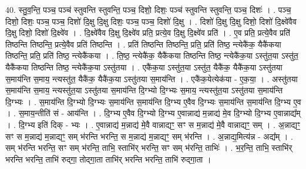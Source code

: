 \documentclass[17pt]{extarticle}
\begin{document}
40. स्तु॒व॒न्ति॒ पञ्च॒ पञ्च॑ स्तुवन्ति स्तुवन्ति॒ पञ्च॒ दिशो॒ दिशः॒ पञ्च॑ स्तुवन्ति स्तुवन्ति॒ पञ्च॒ दिशः॑ । . पञ्च॒ दिशो॒ दिशः॒ पञ्च॒ पञ्च॒ दिशो॑ दि॒क्षु दि॒क्षु दिशः॒ पञ्च॒ पञ्च॒ दिशो॑ दि॒क्षु । . दिशो॑ दि॒क्षु दि॒क्षु दिशो॒ दिशो॑ दि॒क्ष्वे॑वैव दि॒क्षु दिशो॒ दिशो॑ दि॒क्ष्वे॑व । . दि॒क्ष्वे॑वैव दि॒क्षु दि॒क्ष्वे॑व प्रति॒ प्रत्ये॒व दि॒क्षु दि॒क्ष्वे॑व प्रति॑ । . ए॒व प्रति॒ प्रत्ये॒वैव प्रति॑ तिष्ठन्ति तिष्ठन्ति॒ प्रत्ये॒वैव प्रति॑ तिष्ठन्ति । . प्रति॑ तिष्ठन्ति तिष्ठन्ति॒ प्रति॒ प्रति॑ तिष्ठ॒ न्त्येकै॑क॒ यैकै॑कया तिष्ठन्ति॒ प्रति॒ प्रति॑ तिष्ठ॒ न्त्येकै॑कया । . ति॒ष्ठ॒ न्त्येकै॑क॒ यैकै॑कया तिष्ठन्ति तिष्ठ॒ न्त्येकै॑क॒या ऽस्तु॑त॒या ऽस्तु॑त॒ यैकै॑कया तिष्ठन्ति तिष्ठ॒ न्त्येकै॑क॒या ऽस्तु॑तया । . एकै॑क॒या ऽस्तु॑त॒या ऽस्तु॑त॒ यैकै॑क॒ यैकै॑क॒या ऽस्तु॑तया स॒माय॑न्ति स॒माय॒ न्त्यस्तु॑त॒ यैकै॑क॒
यैकै॑क॒या ऽस्तु॑तया स॒माय॑न्ति । . एकै॑क॒येत्येक॑या - ए॒क॒या॒ । . अस्तु॑तया स॒माय॑न्ति स॒माय॒ न्त्यस्तु॑त॒या ऽस्तु॑तया स॒माय॑न्ति दि॒ग्भ्यो दि॒ग्भ्यः स॒माय॒ न्त्यस्तु॑त॒या ऽस्तु॑तया स॒माय॑न्ति दि॒ग्भ्यः । . स॒माय॑न्ति दि॒ग्भ्यो दि॒ग्भ्यः स॒माय॑न्ति स॒माय॑न्ति दि॒ग्भ्य ए॒वैव दि॒ग्भ्यः स॒माय॑न्ति स॒माय॑न्ति दि॒ग्भ्य ए॒व । . स॒माय॒न्तीति॑ सं - आय॑न्ति । . दि॒ग्भ्य ए॒वैव दि॒ग्भ्यो दि॒ग्भ्य ए॒वान्नाद्य॑ म॒न्नाद्य॑ मे॒व दि॒ग्भ्यो दि॒ग्भ्य ए॒वान्नाद्य᳚म् । . दि॒ग्भ्य इति॑ दिक् - भ्यः । . ए॒वान्नाद्य॑ म॒न्नाद्य॑ मे॒वै वान्नाद्यꣳ॒॒ सꣳ स म॒न्नाद्य॑ मे॒वै वान्नाद्यꣳ॒॒ सम् । . अ॒न्नाद्यꣳ॒॒ सꣳ स म॒न्नाद्य॑ म॒न्नाद्यꣳ॒॒ सम् भ॑रन्ति भरन्ति॒ स म॒न्नाद्य॑ म॒न्नाद्यꣳ॒॒ सम् भ॑रन्ति । . अ॒न्नाद्य॒मित्य॑न्न - अद्य᳚म् । . सम् भ॑रन्ति भरन्ति॒ सꣳ सम् भ॑रन्ति॒ ताभि॒ स्ताभि॑र् भरन्ति॒ सꣳ सम् भ॑रन्ति॒ ताभिः॑ । . भ॒र॒न्ति॒ ताभि॒ स्ताभि॑र् भरन्ति भरन्ति॒ ताभि॑ रुद्‍गा॒ तोद्‍गा॒ता ताभि॑र् भरन्ति भरन्ति॒ ताभि॑ रुद्‍गा॒ता । \newline
\end{document}
